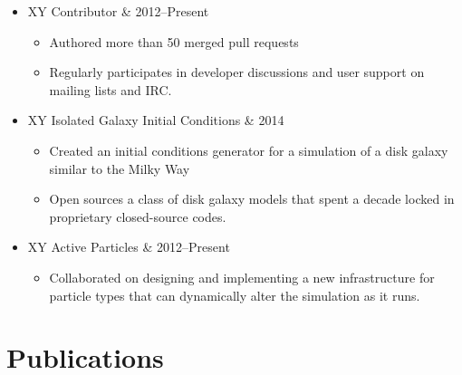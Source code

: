 \documentclass[10pt,letterpaper]{article}
\newcommand{\textline}[2]{
  \begin{tabularx}{\textwidth}{XY}
  #1 & #2
  \end{tabularx}
}
\begin{document}
\begin{itemize}
\item[] \textline{Contributor}{2012--Present}
  \begin{itemize}
  \item Authored more than 50 merged pull requests
  \item Regularly participates in developer discussions and user support on mailing lists and IRC.
  \end{itemize}
\item[] \textline{Isolated Galaxy Initial Conditions}{2014}
  \begin{itemize}
  \item Created an initial conditions generator for a simulation of a disk
    galaxy similar to the Milky Way
  \item Open sources a class of disk galaxy models that spent a decade locked in
    proprietary closed-source codes.
  \end{itemize}
\item[] \textline{Active Particles}{2012--Present}
  \begin{itemize}
  \item Collaborated on designing and implementing a new infrastructure for
    particle types that can dynamically alter the simulation as it runs.
  \end{itemize}
\end{itemize}

\section*{Publications}
\end{document}
